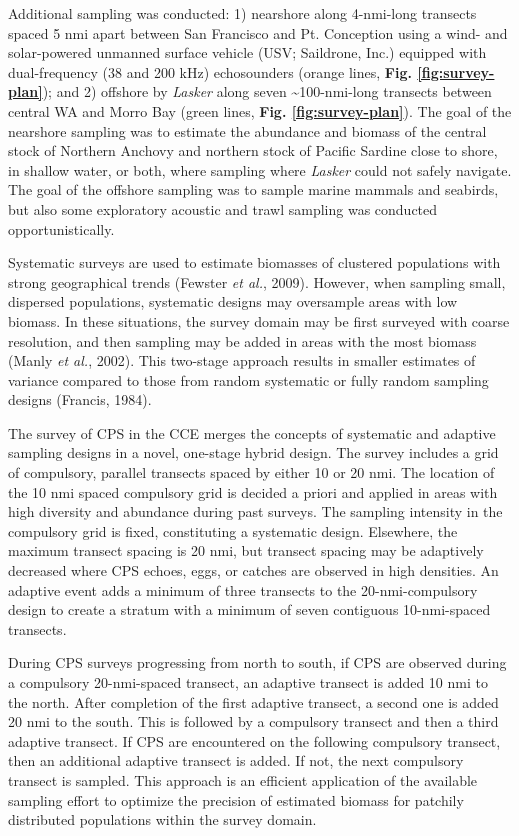 \documentclass[]{article}
\begin{document}
Additional sampling was conducted: 1) nearshore along 4-nmi-long transects spaced 5 nmi apart between San Francisco and Pt. Conception using a wind- and solar-powered unmanned surface vehicle (USV; Saildrone, Inc.) equipped with dual-frequency (38 and 200 kHz) echosounders (orange lines, \textbf{Fig. \ref{fig:survey-plan}}); and 2) offshore by \emph{Lasker} along seven \textasciitilde100-nmi-long transects between central WA and Morro Bay (green lines, \textbf{Fig. \ref{fig:survey-plan}}). The goal of the nearshore sampling was to estimate the abundance and biomass of the central stock of Northern Anchovy and northern stock of Pacific Sardine close to shore, in shallow water, or both, where sampling where \emph{Lasker} could not safely navigate. The goal of the offshore sampling was to sample marine mammals and seabirds, but also some exploratory acoustic and trawl sampling was conducted opportunistically.

Systematic surveys are used to estimate biomasses of clustered populations with strong geographical trends (Fewster \emph{et al.}, 2009). However, when sampling small, dispersed populations, systematic designs may oversample areas with low biomass. In these situations, the survey domain may be first surveyed with coarse resolution, and then sampling may be added in areas with the most biomass (Manly \emph{et al.}, 2002). This two-stage approach results in smaller estimates of variance compared to those from random systematic or fully random sampling designs (Francis, 1984).

The survey of CPS in the CCE merges the concepts of systematic and adaptive sampling designs in a novel, one-stage hybrid design. The survey includes a grid of compulsory, parallel transects spaced by either 10 or 20 nmi. The location of the 10 nmi spaced compulsory grid is decided a priori and applied in areas with high diversity and abundance during past surveys. The sampling intensity in the compulsory grid is fixed, constituting a systematic design. Elsewhere, the maximum transect spacing is 20 nmi, but transect spacing may be adaptively decreased where CPS echoes, eggs, or catches are observed in high densities. An adaptive event adds a minimum of three transects to the 20-nmi-compulsory design to create a stratum with a minimum of seven contiguous 10-nmi-spaced transects.

During CPS surveys progressing from north to south, if CPS are observed during a compulsory 20-nmi-spaced transect, an adaptive transect is added 10 nmi to the north. After completion of the first adaptive transect, a second one is added 20 nmi to the south. This is followed by a compulsory transect and then a third adaptive transect. If CPS are encountered on the following compulsory transect, then an additional adaptive transect is added. If not, the next compulsory transect is sampled. This approach is an efficient application of the available sampling effort to optimize the precision of estimated biomass for patchily distributed populations within the survey domain.
\end{document}
